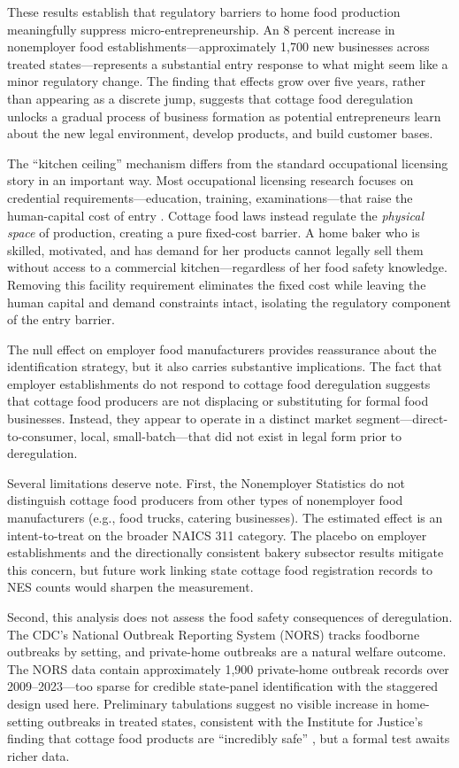 \documentclass[12pt]{article}
\begin{document}
These results establish that regulatory barriers to home food production meaningfully suppress micro-entrepreneurship. An 8 percent increase in nonemployer food establishments---approximately 1,700 new businesses across treated states---represents a substantial entry response to what might seem like a minor regulatory change. The finding that effects grow over five years, rather than appearing as a discrete jump, suggests that cottage food deregulation unlocks a gradual process of business formation as potential entrepreneurs learn about the new legal environment, develop products, and build customer bases.

The ``kitchen ceiling'' mechanism differs from the standard occupational licensing story in an important way. Most occupational licensing research focuses on credential requirements---education, training, examinations---that raise the human-capital cost of entry \citep{kleiner2006licensing, kleiner2015reforming, johnson2020regulation}. Cottage food laws instead regulate the \textit{physical space} of production, creating a pure fixed-cost barrier. A home baker who is skilled, motivated, and has demand for her products cannot legally sell them without access to a commercial kitchen---regardless of her food safety knowledge. Removing this facility requirement eliminates the fixed cost while leaving the human capital and demand constraints intact, isolating the regulatory component of the entry barrier.

The null effect on employer food manufacturers provides reassurance about the identification strategy, but it also carries substantive implications. The fact that employer establishments do not respond to cottage food deregulation suggests that cottage food producers are not displacing or substituting for formal food businesses. Instead, they appear to operate in a distinct market segment---direct-to-consumer, local, small-batch---that did not exist in legal form prior to deregulation.

Several limitations deserve note. First, the Nonemployer Statistics do not distinguish cottage food producers from other types of nonemployer food manufacturers (e.g., food trucks, catering businesses). The estimated effect is an intent-to-treat on the broader NAICS 311 category. The placebo on employer establishments and the directionally consistent bakery subsector results mitigate this concern, but future work linking state cottage food registration records to NES counts would sharpen the measurement.

Second, this analysis does not assess the food safety consequences of deregulation. The CDC's National Outbreak Reporting System (NORS) tracks foodborne outbreaks by setting, and private-home outbreaks are a natural welfare outcome. The NORS data contain approximately 1,900 private-home outbreak records over 2009--2023---too sparse for credible state-panel identification with the staggered design used here. Preliminary tabulations suggest no visible increase in home-setting outbreaks in treated states, consistent with the Institute for Justice's finding that cottage food products are ``incredibly safe'' \citep{ij2023bakingbad}, but a formal test awaits richer data.
\end{document}
